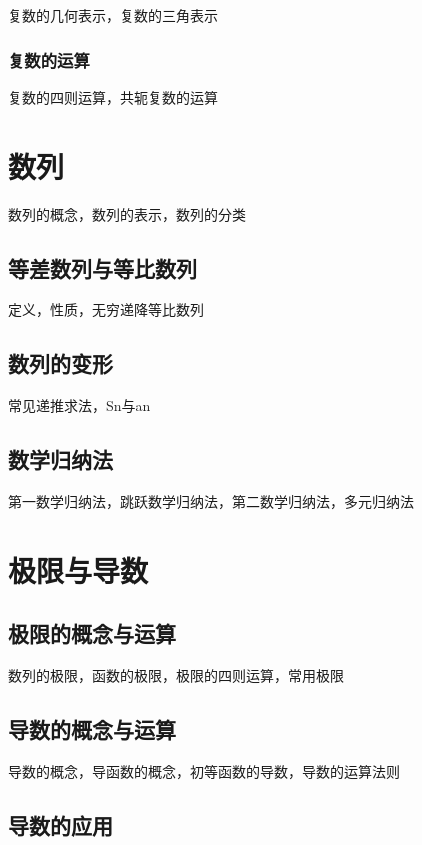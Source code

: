 \documentclass[lang=cn, zihao=4.5]{elegantbook}
\begin{document}
复数的几何表示，复数的三角表示

\subsection{复数的运算}

复数的四则运算，共轭复数的运算

\chapter{数列}

数列的概念，数列的表示，数列的分类

\section{等差数列与等比数列}

定义，性质，无穷递降等比数列

\section{数列的变形}

常见递推求法，Sn与an

\section{数学归纳法}

第一数学归纳法，跳跃数学归纳法，第二数学归纳法，多元归纳法

\chapter{极限与导数}

\section{极限的概念与运算}

数列的极限，函数的极限，极限的四则运算，常用极限

\section{导数的概念与运算}

导数的概念，导函数的概念，初等函数的导数，导数的运算法则

\section{导数的应用}
\end{document}
